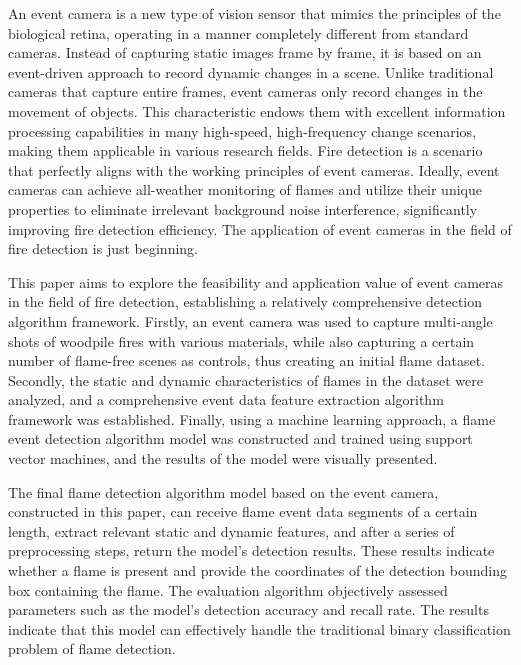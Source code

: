 \begin{abstract*}
  An event camera is a new type of vision sensor that mimics the principles of the biological retina, operating in a manner completely different from standard cameras. Instead of capturing static images frame by frame, it is based on an event-driven approach to record dynamic changes in a scene. Unlike traditional cameras that capture entire frames, event cameras only record changes in the movement of objects. This characteristic endows them with excellent information processing capabilities in many high-speed, high-frequency change scenarios, making them applicable in various research fields.
  Fire detection is a scenario that perfectly aligns with the working principles of event cameras. Ideally, event cameras can achieve all-weather monitoring of flames and utilize their unique properties to eliminate irrelevant background noise interference, significantly improving fire detection efficiency. The application of event cameras in the field of fire detection is just beginning.

  This paper aims to explore the feasibility and application value of event cameras in the field of fire detection, establishing a relatively comprehensive detection algorithm framework. Firstly, an event camera was used to capture multi-angle shots of woodpile fires with various materials, while also capturing a certain number of flame-free scenes as controls, thus creating an initial flame dataset. Secondly, the static and dynamic characteristics of flames in the dataset were analyzed, and a comprehensive event data feature extraction algorithm framework was established. Finally, using a machine learning approach, a flame event detection algorithm model was constructed and trained using support vector machines, and the results of the model were visually presented.

  The final flame detection algorithm model based on the event camera, constructed in this paper, can receive flame event data segments of a certain length, extract relevant static and dynamic features, and after a series of preprocessing steps, return the model's detection results. These results indicate whether a flame is present and provide the coordinates of the detection bounding box containing the flame. The evaluation algorithm objectively assessed parameters such as the model's detection accuracy and recall rate. The results indicate that this model can effectively handle the traditional binary classification problem of flame detection.







\end{abstract*}
